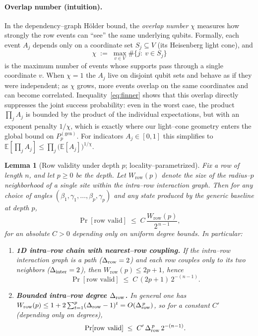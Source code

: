 \documentclass[a4paper,onecolumn,11pt,unpublished]{quantumarticle}
\newtheorem{lemma}[theorem]{Lemma}
\theoremstyle{remark}
\begin{document}
\paragraph{Overlap number (intuition).}
In the dependency–graph Hölder bound, the \emph{overlap number} $\chi$ measures
how strongly the row events can ``see'' the same underlying qubits.  Formally,
each event $A_j$ depends only on a coordinate set $S_j\subseteq V$ (its
Heisenberg light cone), and
\[
  \chi \;:=\; \max_{v\in V}\#\{j:\ v\in S_j\}
\]
is the maximum number of events whose supports pass through a single coordinate
$v$.  When $\chi=1$ the $A_j$ live on disjoint qubit sets and behave as if they
were independent; as $\chi$ grows, more events overlap on the same coordinates
and can become correlated.  Inequality~\eqref{eq:finner} shows that this overlap
directly suppresses the joint success probability: even in the worst case, the
product $\prod_j A_j$ is bounded by the product of the individual expectations,
but with an exponent penalty $1/\chi$, which is exactly where our light–cone
geometry enters the global bound on $P_p^{\mathrm{(gen)}}$. For indicators $A_j\in[0,1]$ this simplifies to $\mathbb{E}[\prod_j A_j]\le \prod_j \bigl(\mathbb{E}[A_j]\bigr)^{1/\chi}$.


\begin{lemma}[Row validity under depth $p$; locality–parametrized]
\label{lem:row-valid-general}
Fix a row of length $n$, and let $p\ge0$ be the depth. Let
$W_{\mathrm{row}}(p)$ denote the size of the radius–$p$ neighborhood of a
\emph{single} site within the intra–row interaction graph.
Then for any choice of angles $(\beta_1,\gamma_1,\dots,\beta_p,\gamma_p)$
and any state produced by the generic baseline at depth $p$,
\[
  \Pr[\text{row valid}]
  \;\le\;
  C\,\frac{W_{\mathrm{row}}(p)}{2^{\,n-1}},
\]
for an absolute $C>0$ depending only on uniform degree bounds. In particular:
\begin{enumerate}
\item[(a)] \textbf{1D intra–row chain with nearest–row coupling.}
If the intra–row interaction graph is a path ($\Delta_{\rm row}=2$) and
each row couples only to its two neighbors ($\Delta_{\rm inter}=2$),
then $W_{\mathrm{row}}(p)\le 2p{+}1$, hence
\[
  \Pr[\text{row valid}]\;\le\;C\,(2p{+}1)\,2^{-(n-1)}.
\]
\item[(b)] \textbf{Bounded intra–row degree $\Delta_{\rm row}$.}
In general one has
\(
  W_{\mathrm{row}}(p)\le 1+2\sum_{t=1}^p (\Delta_{\rm row}-1)^t
  = O(\Delta_{\rm row}^{\,p})
\),
so for a constant $C'$ (depending only on degrees),
\[
  \Pr[\text{row valid}]\;\le\; C'\,\Delta_{\rm row}^{\,p}\,2^{-(n-1)}.
\]
\end{enumerate}
\end{lemma}
\end{document}

